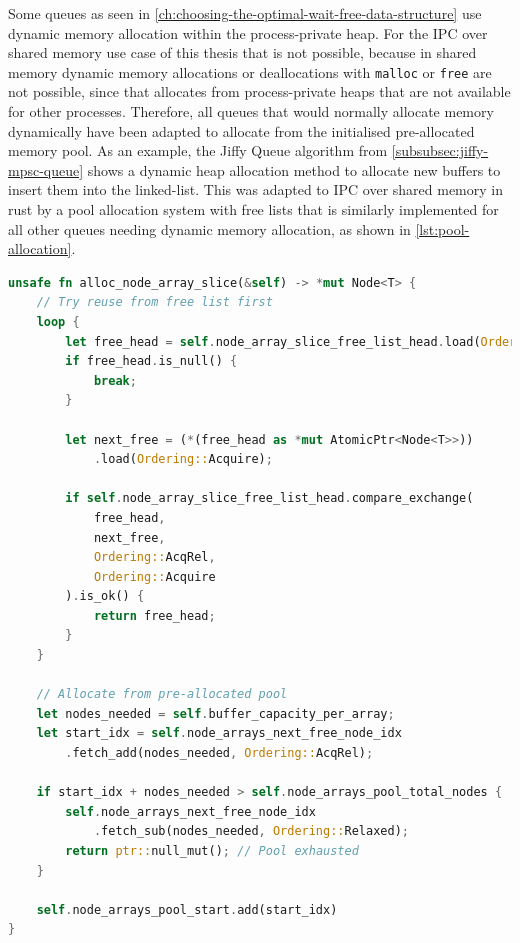 Some queues as seen in \cref{ch:choosing-the-optimal-wait-free-data-structure} use dynamic memory allocation within the process-private heap. For the \ac{IPC} over shared memory use case of this thesis that is not possible, because in shared memory dynamic memory allocations or deallocations with \texttt{malloc} or \texttt{free} are not possible, since that allocates from process-private heaps that are not available for other processes. Therefore, all queues that would normally allocate memory dynamically have been adapted to allocate from the initialised pre-allocated memory pool. As an example, the Jiffy Queue algorithm from \cref{subsubsec:jiffy-mpsc-queue} shows a dynamic heap allocation method to allocate new buffers to insert them into the linked-list. This was adapted to \ac{IPC} over shared memory in rust by a pool allocation system with free lists that is similarly implemented for all other queues needing dynamic memory allocation, as shown in \cref{lst:pool-allocation}.

\begin{lstlisting}[language=Rust, style=boxed, caption={Lock-free memory pool allocation}, label={lst:pool-allocation}]
unsafe fn alloc_node_array_slice(&self) -> *mut Node<T> {
    // Try reuse from free list first
    loop {
        let free_head = self.node_array_slice_free_list_head.load(Ordering::Acquire);
        if free_head.is_null() {
            break;
        }
        
        let next_free = (*(free_head as *mut AtomicPtr<Node<T>>))
            .load(Ordering::Acquire);
            
        if self.node_array_slice_free_list_head.compare_exchange(
            free_head, 
            next_free, 
            Ordering::AcqRel, 
            Ordering::Acquire
        ).is_ok() {
            return free_head;
        }
    }
    
    // Allocate from pre-allocated pool
    let nodes_needed = self.buffer_capacity_per_array;
    let start_idx = self.node_arrays_next_free_node_idx
        .fetch_add(nodes_needed, Ordering::AcqRel);
        
    if start_idx + nodes_needed > self.node_arrays_pool_total_nodes {
        self.node_arrays_next_free_node_idx
            .fetch_sub(nodes_needed, Ordering::Relaxed);
        return ptr::null_mut(); // Pool exhausted
    }
    
    self.node_arrays_pool_start.add(start_idx)
}
\end{lstlisting}

